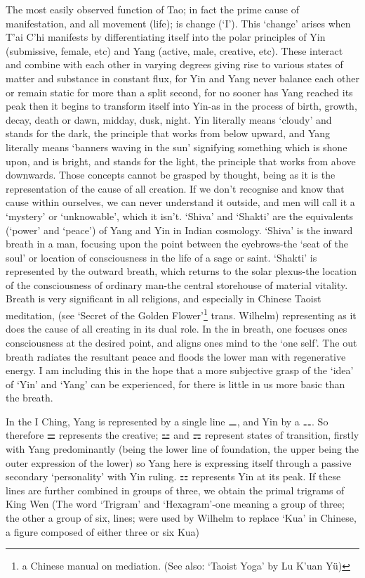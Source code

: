 \documentclass[11pt]{book}
\begin{document}
The most easily observed function of Tao; in fact the prime cause of manifestation, and all movement (life); is change (`I'). This `change' arises when T'ai C'hi manifests by differentiating itself into the polar principles of Yin (submissive, female, etc) and Yang (active, male, creative, etc). These interact and combine with each other in varying degrees giving rise to various states of matter and substance in constant flux, for Yin and Yang never balance each other or remain static for more than a split second, for no sooner has Yang reached its peak then it begins to transform itself into Yin-as in the process of birth, growth, decay, death or dawn, midday, dusk, night. Yin literally means `cloudy' and stands for the dark, the principle that works from below upward, and Yang literally means `banners waving in the sun' signifying something which is shone upon, and is bright, and stands for the light, the principle that works from above downwards. Those concepts cannot be grasped by thought, being as it is the representation of the cause of all creation. If we don't recognise and know that cause within ourselves, we can never understand it outside, and men will call it a `mystery' or `unknowable', which it isn't. `Shiva' and `Shakti' are the equivalents (`power' and `peace') of Yang and Yin in Indian cosmology. `Shiva' is the inward breath in a man, focusing upon the point between the eyebrows-the `seat of the soul' or location of consciousness in the life of a sage or saint. `Shakti' is represented by the outward breath, which returns to the solar plexus-the location of the consciousness of ordinary man-the central storehouse of material vitality. Breath is very significant in all religions, and especially in Chinese Taoist meditation, (see `Secret of the Golden Flower'\footnote{a Chinese manual on mediation. (See also: `Taoist Yoga' by Lu K'uan Yü)} trans. Wilhelm) representing as it does the cause of all creating in its dual role. In the in breath, one focuses ones consciousness at the desired point, and aligns ones mind to the `one self'. The out breath radiates the resultant peace and floods the lower man with regenerative energy. I am including this in the hope that a more subjective grasp of the `idea' of `Yin' and `Yang' can be experienced, for there is little in us more basic than the breath.

In the I Ching, Yang is represented by a single line ⚊, and Yin by a ⚋. So therefore ⚌ represents the creative; ⚍ and ⚎ represent states of transition, firstly with Yang predominantly (being the lower line of foundation, the upper being the outer expression of the lower) so Yang here is expressing itself through a passive secondary `personality' with Yin ruling. ⚏ represents Yin at its peak. If these lines are further combined in groups of three, we obtain the primal trigrams of King Wen (The word `Trigram' and `Hexagram'-one meaning a group of three; the other a group of six, lines; were used by Wilhelm to replace `Kua' in Chinese, a figure composed of either three or six Kua)
\end{document}

